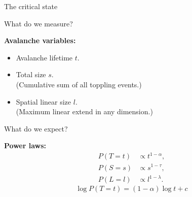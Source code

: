 \begin{frame}{The critical state}

    \centering
\end{frame}


\begin{frame}{What do we measure?}

    \textbf{Avalanche variables:}
    \begin{itemize}
        \item Avalanche lifetime $t$.
        \item Total size $s$. \\ (Cumulative sum of all toppling events.)
        \item Spatial linear size $l$. \\ (Maximum linear extend in any dimension.)
    \end{itemize}

\end{frame}


\begin{frame}{What do we expect?}

    \textbf{Power laws:}
    \begin{align*}
        P(T=t) &\propto t^{1-\alpha}, \\
        P(S=s) &\propto s^{1-\tau}, \\
        P(L=l) &\propto l^{1-\lambda}.
    \end{align*}
    \pause
    \begin{equation*}
        \log P(T=t) = (1-\alpha) \log t + c
    \end{equation*}
\end{frame}
